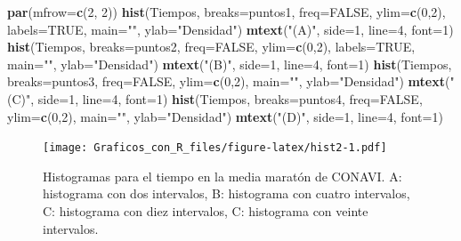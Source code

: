 \documentclass[10pt,]{krantz}
\makeatletter
\newenvironment{Shaded}{\begin{snugshade}}{\end{snugshade}}
\newcommand{\KeywordTok}[1]{\textcolor[rgb]{0.13,0.29,0.53}{\textbf{{#1}}}}
\newcommand{\DataTypeTok}[1]{\textcolor[rgb]{0.13,0.29,0.53}{{#1}}}
\newcommand{\DecValTok}[1]{\textcolor[rgb]{0.00,0.00,0.81}{{#1}}}
\newcommand{\StringTok}[1]{\textcolor[rgb]{0.31,0.60,0.02}{{#1}}}
\newcommand{\OtherTok}[1]{\textcolor[rgb]{0.56,0.35,0.01}{{#1}}}
\newcommand{\NormalTok}[1]{{#1}}
\newenvironment{kframe}{%
\medskip{}
\setlength{\fboxsep}{.8em}
 \def\at@end@of@kframe{}%
 \ifinner\ifhmode%
  \def\at@end@of@kframe{\end{minipage}}%
  \begin{minipage}{\columnwidth}%
 \fi\fi%
 \def\FrameCommand##1{\hskip\@totalleftmargin \hskip-\fboxsep
 \colorbox{shadecolor}{##1}\hskip-\fboxsep
     \hskip-\linewidth \hskip-\@totalleftmargin \hskip\columnwidth}%
 \MakeFramed {\advance\hsize-\width
   \@totalleftmargin\z@ \linewidth\hsize
   \@setminipage}}%
 {\par\unskip\endMakeFramed%
 \at@end@of@kframe}
\renewenvironment{Shaded}{\begin{kframe}}{\end{kframe}}
\makeatother
\begin{document}
\begin{Shaded}
\begin{Highlighting}[]
\KeywordTok{par}\NormalTok{(}\DataTypeTok{mfrow=}\KeywordTok{c}\NormalTok{(}\DecValTok{2}\NormalTok{, }\DecValTok{2}\NormalTok{))}
\KeywordTok{hist}\NormalTok{(Tiempos, }\DataTypeTok{breaks=}\NormalTok{puntos1, }\DataTypeTok{freq=}\OtherTok{FALSE}\NormalTok{, }\DataTypeTok{ylim=}\KeywordTok{c}\NormalTok{(}\DecValTok{0}\NormalTok{,}\DecValTok{2}\NormalTok{), }\DataTypeTok{labels=}\OtherTok{TRUE}\NormalTok{,}
     \DataTypeTok{main=}\StringTok{""}\NormalTok{, }\DataTypeTok{ylab=}\StringTok{"Densidad"}\NormalTok{)}
\KeywordTok{mtext}\NormalTok{(}\StringTok{"(A)"}\NormalTok{, }\DataTypeTok{side=}\DecValTok{1}\NormalTok{, }\DataTypeTok{line=}\DecValTok{4}\NormalTok{, }\DataTypeTok{font=}\DecValTok{1}\NormalTok{)}
\KeywordTok{hist}\NormalTok{(Tiempos, }\DataTypeTok{breaks=}\NormalTok{puntos2, }\DataTypeTok{freq=}\OtherTok{FALSE}\NormalTok{, }\DataTypeTok{ylim=}\KeywordTok{c}\NormalTok{(}\DecValTok{0}\NormalTok{,}\DecValTok{2}\NormalTok{), }\DataTypeTok{labels=}\OtherTok{TRUE}\NormalTok{,}
     \DataTypeTok{main=}\StringTok{""}\NormalTok{, }\DataTypeTok{ylab=}\StringTok{"Densidad"}\NormalTok{)}
\KeywordTok{mtext}\NormalTok{(}\StringTok{"(B)"}\NormalTok{, }\DataTypeTok{side=}\DecValTok{1}\NormalTok{, }\DataTypeTok{line=}\DecValTok{4}\NormalTok{, }\DataTypeTok{font=}\DecValTok{1}\NormalTok{)}
\KeywordTok{hist}\NormalTok{(Tiempos, }\DataTypeTok{breaks=}\NormalTok{puntos3, }\DataTypeTok{freq=}\OtherTok{FALSE}\NormalTok{, }\DataTypeTok{ylim=}\KeywordTok{c}\NormalTok{(}\DecValTok{0}\NormalTok{,}\DecValTok{2}\NormalTok{),}
     \DataTypeTok{main=}\StringTok{""}\NormalTok{, }\DataTypeTok{ylab=}\StringTok{"Densidad"}\NormalTok{)}
\KeywordTok{mtext}\NormalTok{(}\StringTok{"(C)"}\NormalTok{, }\DataTypeTok{side=}\DecValTok{1}\NormalTok{, }\DataTypeTok{line=}\DecValTok{4}\NormalTok{, }\DataTypeTok{font=}\DecValTok{1}\NormalTok{)}
\KeywordTok{hist}\NormalTok{(Tiempos, }\DataTypeTok{breaks=}\NormalTok{puntos4, }\DataTypeTok{freq=}\OtherTok{FALSE}\NormalTok{, }\DataTypeTok{ylim=}\KeywordTok{c}\NormalTok{(}\DecValTok{0}\NormalTok{,}\DecValTok{2}\NormalTok{),}
     \DataTypeTok{main=}\StringTok{""}\NormalTok{, }\DataTypeTok{ylab=}\StringTok{"Densidad"}\NormalTok{)}
\KeywordTok{mtext}\NormalTok{(}\StringTok{"(D)"}\NormalTok{, }\DataTypeTok{side=}\DecValTok{1}\NormalTok{, }\DataTypeTok{line=}\DecValTok{4}\NormalTok{, }\DataTypeTok{font=}\DecValTok{1}\NormalTok{)}
\end{Highlighting}
\end{Shaded}

\begin{figure}[htbp]
\centering
\texttt{[image: Graficos\_con\_R\_files/figure-latex/hist2-1.pdf]}
\caption{\label{fig:hist2}Histogramas para el tiempo en la media maratón de
CONAVI. A: histograma con dos intervalos, B: histograma con cuatro
intervalos, C: histograma con diez intervalos, C: histograma con veinte
intervalos.}
\end{figure}
\end{document}
